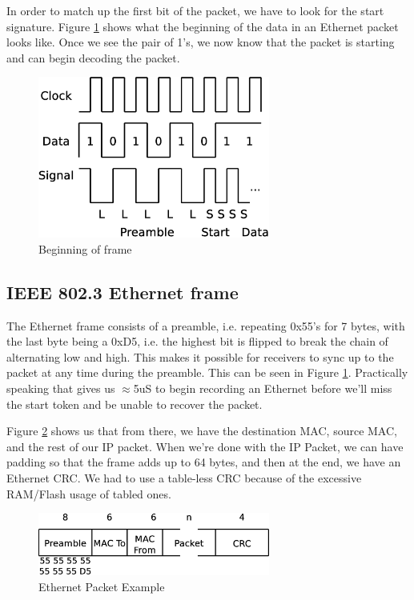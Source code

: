 \documentclass[13pt]{ltxdoc}
\begin{document}
In order to match up the first bit of the packet, we have to look for the start signature.
Figure \ref{manchesterb} shows what the beginning of the data in an Ethernet packet looks like.
Once we see the pair of 1's, we now know that the packet is starting and can begin 
decoding the packet.

\begin{figure}
    \centering
    \includegraphics[width=3.0in]{manchesterb}
    \caption{Beginning of frame}
    \label{manchesterb}
\end{figure}


\subsection{IEEE 802.3 Ethernet frame}
The Ethernet frame consists of a preamble, i.e. repeating 0x55's for 7 bytes, with the last
byte being a 0xD5, i.e. the highest bit is flipped to break the chain of alternating low
and high.  This makes it possible for receivers to sync up to the packet at any time during the
preamble.  This can be seen in Figure \ref{manchesterb}.  Practically speaking that gives us $\approx$5uS to begin recording an Ethernet 
before we'll miss the start token and be unable to recover the packet.

Figure \ref{etherfarme} shows us that from there, we have the destination MAC, source MAC, and the rest of our IP packet.
When we're done with the IP Packet, we can have padding so that the frame adds up to 64 bytes, and then at the end, we have an Ethernet CRC.
We had to use a table-less CRC because of the excessive RAM/Flash usage of tabled ones.

\begin{figure}
    \centering
    \includegraphics[width=3.0in]{etherframe}
    \caption{Ethernet Packet Example}
    \label{etherfarme}
\end{figure}
\end{document}
